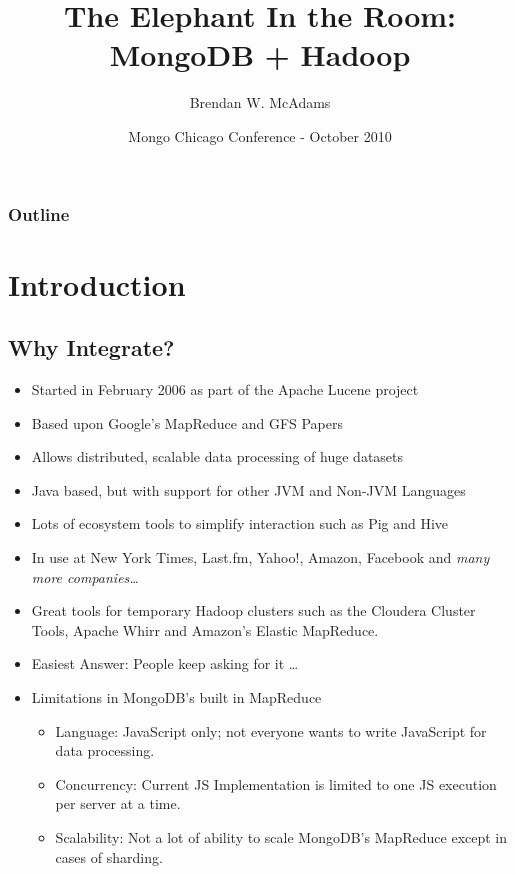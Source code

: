 \documentclass{beamer}
\title{The Elephant In the Room: MongoDB + Hadoop} %
\institute[10gen]{10gen, Inc.}
\author[B.W. McAdams]{Brendan W. McAdams}
\date{Mongo Chicago Conference - October 2010}
\newenvironment{itemizeframe}
               {\begin{frame}\startitemizeframe} 
               {\stopitemizeframe\end{frame}}
\newcommand\startitemizeframe{\begin{itemize}} \newcommand\stopitemizeframe{\end{itemize}}
\begin{document}
\begin{frame}
  \titlepage
\end{frame}

\begin{frame}
\frametitle{Outline}
  \tableofcontents
\end{frame}

\section{Introduction}

\subsection[Mongo + Hadoop]{Why Integrate?}
\begin{itemizeframe}
    \frametitle{Hadoop Explained\ldots}
	\item Started in February 2006 as part of the Apache Lucene project
	\item Based upon Google's MapReduce and GFS Papers
	\item Allows distributed, scalable data processing of huge datasets
	\item Java based, but with support for other JVM and Non-JVM Languages
	\item Lots of ecosystem tools to simplify interaction such as Pig and Hive
	\item In use at New York Times, Last.fm, Yahoo!, Amazon, Facebook and {\em many more companies\ldots}
	\item Great tools for temporary Hadoop clusters such as the Cloudera Cluster Tools, Apache Whirr and Amazon's Elastic MapReduce.
\end{itemizeframe}

\begin{itemizeframe}
    \frametitle{Why Integrate MongoDB?}
	\item Easiest Answer: People keep asking for it \ldots
	\item Limitations in MongoDB's built in MapReduce
    \begin{itemize}
        \item<2-> Language: JavaScript only; not everyone wants to write JavaScript for data processing.
        \item<3-> Concurrency: Current JS Implementation is limited to one JS execution per server at a time.
        \item<4-> Scalability: Not a lot of ability to scale MongoDB's MapReduce except in cases of sharding.
    \end{itemize}
\end{itemizeframe}
\end{document}

